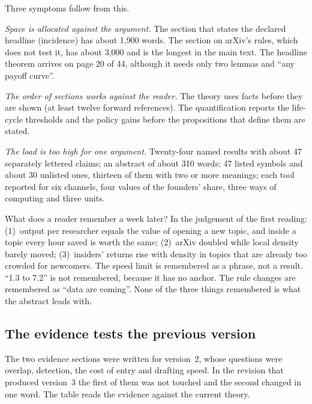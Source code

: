 Three symptoms follow from this.

\emph{Space is allocated against the argument.} The section that states the declared headline (incidence) has about 1,900 words. The section on arXiv's rules, which does not test it, has about 3,000 and is the longest in the main text. The headline theorem arrives on page 20 of 44, although it needs only two lemmas and ``any payoff curve''.

\emph{The order of sections works against the reader.} The theory uses facts before they are shown (at least twelve forward references). The quantification reports the life-cycle thresholds and the policy gains before the propositions that define them are stated.

\emph{The load is too high for one argument.} Twenty-four named results with about 47 separately lettered claims; an abstract of about 310 words; 47 listed symbols and about 30 unlisted ones, thirteen of them with two or more meanings; each tool reported for six channels, four values of the founders' share, three ways of computing and three units.

\begin{critbox}
What does a reader remember a week later? In the judgement of the first reading: (1)~output per researcher equals the value of opening a new topic, and inside a topic every hour saved is worth the same; (2)~arXiv doubled while local density barely moved; (3)~insiders' returns rise with density in topics that are already too crowded for newcomers. The speed limit is remembered as a phrase, not a result. ``1.3 to 7.2'' is not remembered, because it has no anchor. The rule changes are remembered as ``data are coming''. None of the three things remembered is what the abstract leads with.
\end{critbox}

\subsection{The evidence tests the previous version}

The two evidence sections were written for version~2, whose questions were overlap, detection, the cost of entry and drafting speed. In the revision that produced version~3 the first of them was not touched and the second changed in one word. The table reads the evidence against the current theory.

